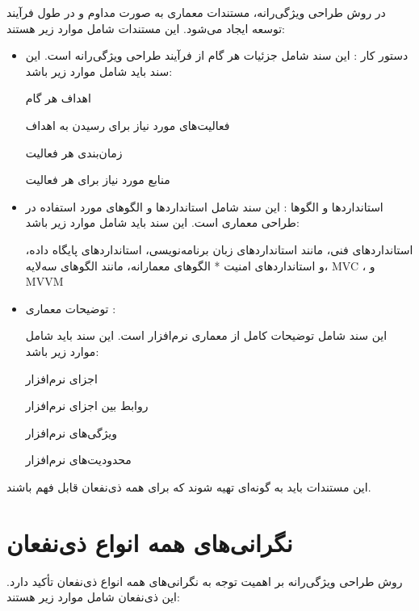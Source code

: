 در روش طراحی ویژگی‌رانه، مستندات معماری به صورت مداوم و در طول فرآیند توسعه ایجاد می‌شود. این مستندات شامل موارد زیر هستند:

\begin{itemize}
	\item دستور کار  : 
	این سند شامل جزئیات هر گام از فرآیند طراحی ویژگی‌رانه است. این سند باید شامل موارد زیر باشد:
	
	اهداف هر گام
	
	فعالیت‌های مورد نیاز برای رسیدن به اهداف
	
	زمان‌بندی هر فعالیت
	
	منابع مورد نیاز برای هر فعالیت
	\item استانداردها و الگوها  :
	این سند شامل استانداردها و الگوهای مورد استفاده در طراحی معماری است. این سند باید شامل موارد زیر باشد:
	
	استانداردهای فنی، مانند استانداردهای زبان برنامه‌نویسی، استانداردهای پایگاه داده، و استانداردهای امنیت
	* الگوهای معمارانه، مانند الگوهای سه‌لایه، MVC ، و MVVM
	\item توضیحات معماری  :
	
	این سند شامل توضیحات کامل از معماری نرم‌افزار است. این سند باید شامل موارد زیر باشد:
	
	اجزای نرم‌افزار
	
	روابط بین اجزای نرم‌افزار
	
	ویژگی‌های نرم‌افزار
	
	محدودیت‌های نرم‌افزار
\end{itemize}

این مستندات باید به گونه‌ای تهیه شوند که برای همه ذی‌نفعان قابل فهم باشند.

\section{نگرانی‌های همه انواع ذی‌نفعان}

روش طراحی ویژگی‌رانه بر اهمیت توجه به نگرانی‌های همه انواع ذی‌نفعان تأکید دارد. این ذی‌نفعان شامل موارد زیر هستند:

